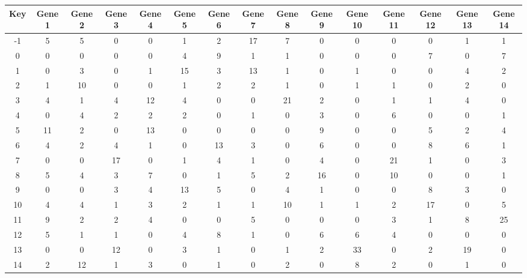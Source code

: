 \begin{tabular}{|c|c|c|c|c|c|c|c|c|c|c|c|c|c|c|}
\hline
Key & Gene 1 & Gene 2 & Gene 3 & Gene 4 & Gene 5 & Gene 6 & Gene 7 & Gene 8 & Gene 9 & Gene 10 & Gene 11 & Gene 12 & Gene 13 & Gene 14 \\
\hline
-1 & 5 & 5 & 0 & 0 & 1 & 2 & 17 & 7 & 0 & 0 & 0 & 0 & 1 & 1 \\
0 & 0 & 0 & 0 & 0 & 4 & 9 & 1 & 1 & 0 & 0 & 0 & 7 & 0 & 7 \\
1 & 0 & 3 & 0 & 1 & 15 & 3 & 13 & 1 & 0 & 1 & 0 & 0 & 4 & 2 \\
2 & 1 & 10 & 0 & 0 & 1 & 2 & 2 & 1 & 0 & 1 & 1 & 0 & 2 & 0 \\
3 & 4 & 1 & 4 & 12 & 4 & 0 & 0 & 21 & 2 & 0 & 1 & 1 & 4 & 0 \\
4 & 0 & 4 & 2 & 2 & 2 & 0 & 1 & 0 & 3 & 0 & 6 & 0 & 0 & 1 \\
5 & 11 & 2 & 0 & 13 & 0 & 0 & 0 & 0 & 9 & 0 & 0 & 5 & 2 & 4 \\
6 & 4 & 2 & 4 & 1 & 0 & 13 & 3 & 0 & 6 & 0 & 0 & 8 & 6 & 1 \\
7 & 0 & 0 & 17 & 0 & 1 & 4 & 1 & 0 & 4 & 0 & 21 & 1 & 0 & 3 \\
8 & 5 & 4 & 3 & 7 & 0 & 1 & 5 & 2 & 16 & 0 & 10 & 0 & 0 & 1 \\
9 & 0 & 0 & 3 & 4 & 13 & 5 & 0 & 4 & 1 & 0 & 0 & 8 & 3 & 0 \\
10 & 4 & 4 & 1 & 3 & 2 & 1 & 1 & 10 & 1 & 1 & 2 & 17 & 0 & 5 \\
11 & 9 & 2 & 2 & 4 & 0 & 0 & 5 & 0 & 0 & 0 & 3 & 1 & 8 & 25 \\
12 & 5 & 1 & 1 & 0 & 4 & 8 & 1 & 0 & 6 & 6 & 4 & 0 & 0 & 0 \\
13 & 0 & 0 & 12 & 0 & 3 & 1 & 0 & 1 & 2 & 33 & 0 & 2 & 19 & 0 \\
14 & 2 & 12 & 1 & 3 & 0 & 1 & 0 & 2 & 0 & 8 & 2 & 0 & 1 & 0 \\
\hline
\end{tabular}